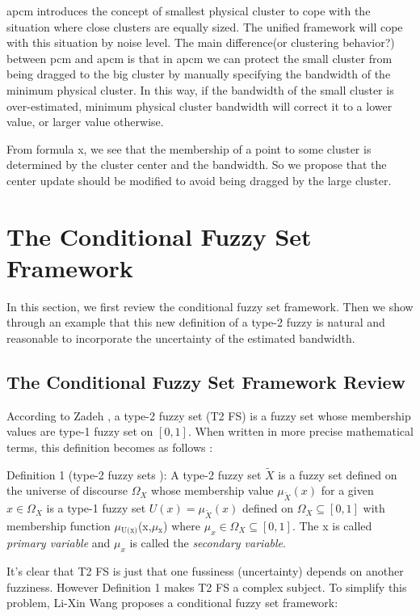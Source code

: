 \documentclass[journal]{IEEEtran}
\begin{document}
apcm introduces the concept of smallest physical cluster to cope with the situation where close clusters are equally sized. The unified framework will cope with this situation by noise level.
The main difference(or clustering behavior?) between pcm and apcm is that in apcm we can protect the small cluster from being dragged to the big cluster by manually specifying the bandwidth of the  minimum physical cluster. In this way, if the bandwidth of the small cluster is over-estimated, minimum physical cluster bandwidth will correct it to a lower value, or larger value otherwise.

From formula x, we see that the membership of a point to some cluster is determined by the cluster center and the bandwidth. So we propose that the center update should be modified to avoid being dragged by the large cluster.
\section{The Conditional Fuzzy Set Framework}
\label{sec-2}
In this section, we first review the conditional fuzzy set framework. Then we show through an example that this new definition of a type-2 fuzzy is natural and reasonable to incorporate the uncertainty of the estimated bandwidth.
\subsection{The Conditional Fuzzy Set Framework Review}
\label{sec-2-1}
According to Zadeh \cite{zadeh_concept_1975}, a type-2 fuzzy set (T2 FS) is a fuzzy set whose membership values are type-1 fuzzy set on $[0,1]$. When written in more precise mathematical terms,  this definition becomes as follows \cite{wang_new_2016}:

Definition 1 (type-2 fuzzy sets ): A type-2 fuzzy set $\tilde{X}$ is a fuzzy set defined on the universe of discourse $\Omega_X$ whose membership value $\mu_\tilde{X}(x)$ for a given $x\in\Omega_X$ is a type-1 fuzzy set  $U(x)=\mu_\tilde{X}(x)$ defined on $\Omega_X\subseteq[0,1]$ with membership function $\mu$$_{\text{U(x)}}$(x,$\mu$$_{\text{x}}$) where $\mu_x\in\Omega_X\subseteq[0,1]$. The x is called \emph{primary variable} and $\mu_x$ is called the \emph{secondary variable}. \qedsymbol

It's clear that T2 FS is just that one fussiness (uncertainty) depends on another fuzziness. However Definition 1 makes T2 FS a complex subject. To simplify this problem, Li-Xin Wang \cite{wang_new_2016} proposes a conditional fuzzy set framework:
\end{document}
